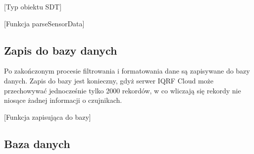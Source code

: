 [Typ obiektu SDT]

[Funkcja parseSensorData]

\subsection{Zapis do bazy danych}

Po zakończonym procesie filtrowania i formatowania dane są zapisywane do bazy danych. Zapis do bazy jest konieczny, gdyż serwer IQRF Cloud może przechowywać
jednocześnie tylko 2000 rekordów, w co wliczają się rekordy nie niosące żadnej informacji o czujnikach.

[Funkcja zapisująca do bazy]

\subsection{Baza danych}





